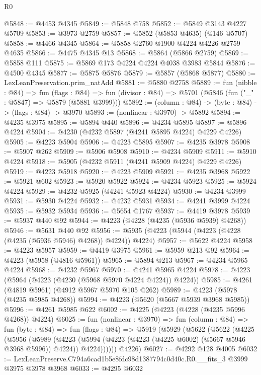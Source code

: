 \begin{lexlean}{R0}
\begin{coremodule}
@5848 := @4453 @4345
@5849 := @5848 @758
@5852 := @5849 @3143 @4227 @5709
@5853 := @3973 @2759
@5857 := @5852 (@5853 @4635) (@146 @5707)
@5858 := @4466 @4345
@5864 := @5858 @2760 @1900 @4224 @4226 @2759 @4635
@5866 := @4475 @4345 @13
@5868 := @5864 (@5866 @2759)
@5869 := @5858 @111
@5875 := @5869 @173 @4224 @4224 @4038 @3983 @5844
@5876 := @4500 @4345
@5877 := @5875 @5876
@5879 := @5857 (@5868 @5877)
@5880 := LexLeanPreservation.prim_natAdd
@5881 := @5880 @2758
@5889 := fun (nibble : @84) =>
  fun (flags : @84) =>
  fun (divisor : @84) => @5701 (@5846 (fun ("_" : @5847) => @5879 (@5881 @3999)))
@5892 := (column : @84) -> (byte : @84) -> (flags : @84) -> @3970
@5893 := (nonlinear : @3970) -> @5892
@5894 := @4235 @3975
@5895 := @5894 @440
@5896 := @4234 @5895
@5897 := @5896 @4224
@5904 := @4230 (@4232 @5897 (@4241 @5895 @4224) @4229 @4226)
@5905 := @4223 @5904
@5906 := @4223 @5895
@5907 := @4235 @3978
@5908 := @5907 @262
@5909 := @5906 @5908
@5910 := @4234 @5909
@5911 := @5910 @4224
@5918 := @5905 (@4232 @5911 (@4241 @5909 @4224) @4229 @4226)
@5919 := @4223 @5918
@5920 := @4223 @5909
@5921 := @4235 @3968
@5922 := @5921 @602
@5923 := @5920 @5922
@5924 := @4234 @5923
@5925 := @5924 @4224
@5929 := @4232 @5925 (@4241 @5923 @4224)
@5930 := @4234 @3999
@5931 := @5930 @4224
@5932 := @4232 @5931
@5934 := @4241 @3999 @4224
@5935 := @5932 @5934
@5936 := @5654 @1767
@5937 := @4419 @3978
@5939 := @5937 @440 @92
@5944 := @4223 (@4228 (@4235 (@5936 @5939) @4268))
@5946 := @5631 @440 @92
@5956 := @5935 (@4223 (@5944 (@4223 (@4228 (@4235 (@5936 @5946) @4268)) @4224)) @4224)
@5957 := @5622 @4224
@5958 := @4223 @5957
@5959 := @4419 @3975
@5961 := @5959 @213 @92
@5964 := @4223 (@5958 (@4816 @5961))
@5965 := @5894 @213
@5967 := @4234 @5965 @4224
@5968 := @4232 @5967
@5970 := @4241 @5965 @4224
@5978 := @4223 (@5964 (@4223 (@4230 (@5968 @5970 @4224 @4224)) @4224))
@5985 := @4261 (@4819 @5961) (@4912 @5967 @5970 @105 @262)
@5989 := @4223 (@5978 (@4235 @5985 @4268))
@5994 := @4223 (@5620 (@5667 @5939 @3968 @5985))
@5996 := @4261 @5985 @622
@6002 := @4225 (@4223 (@4228 (@4235 @5996 @4268)) @4224)
@6025 := fun (nonlinear : @3970) =>
  fun (column : @84) =>
  fun (byte : @84) =>
  fun (flags : @84) =>
  @5919
    (@5929
      (@5622
        (@5622
          (@4225
            (@5956
              (@5989
                (@4223
                  (@5994 (@4223 (@4223 (@4225 @6002) (@5667 @5946 @3968 @5996)) @4224))
                  @4224))))))
      @4226)
@6027 := @4292 @128 @4005
@6032 := LexLeanPreserve.C794a6cad1b5e8fdc98d1387794c0d40c.R0.__fits_3 @3999 @3975 @3978 @3968
@6033 := @4295 @6032

\end{coremodule}
\end{lexlean}
